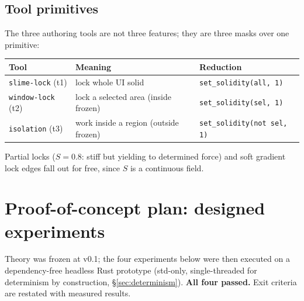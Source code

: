 \documentclass[11pt]{article}
\begin{document}
\subsection{Tool primitives}\label{sec:tools}
The three authoring tools are not three features; they are three masks over one primitive:
\begin{center}
\begin{tabular}{@{}lll@{}}
\toprule
Tool & Meaning & Reduction \\
\midrule
\texttt{slime-lock} (t1) & lock whole UI solid & \texttt{set\_solidity(all, 1)} \\
\texttt{window-lock} (t2) & lock a selected area (inside frozen) & \texttt{set\_solidity(sel, 1)} \\
\texttt{isolation} (t3) & work inside a region (outside frozen) & \texttt{set\_solidity(not sel, 1)} \\
\bottomrule
\end{tabular}
\end{center}
Partial locks ($S=0.8$: stiff but yielding to determined force) and soft gradient lock edges fall
out for free, since $S$ is a continuous field.

\section{Proof-of-concept plan: designed experiments}\label{sec:experiments}

Theory was frozen at v0.1; the four experiments below were then executed on a
dependency-free headless Rust prototype (std-only, single-threaded for determinism by
construction, \S\ref{sec:determinism}). \textbf{All four passed.} Exit criteria are restated
with measured results.
\end{document}
